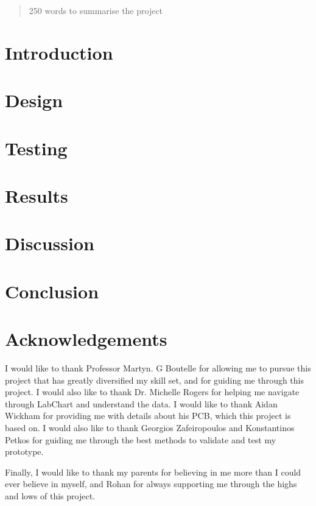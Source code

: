 \documentclass[12pt,twoside]{article}
\begin{document}


\begin{abstract}
    250 words to summarise the project
    
\end{abstract}

\newpage


\section{Introduction}


\section{Design}


\section{Testing}


\section{Results}


\section{Discussion}


\section{Conclusion}


\section{Acknowledgements}
I would like to thank Professor Martyn. G Boutelle for allowing me to pursue this project that has greatly diversified my skill set, and for guiding me through this project. I would also like to thank Dr. Michelle Rogers for helping me navigate through LabChart and understand the data. I would like to thank Aidan Wickham for providing me with details about his PCB, which this project is based on. I would also like to thank Georgios Zafeiropoulos and Konstantinos Petkos for guiding me through the best methods to validate and test my prototype. 

Finally, I would like to thank my parents for believing in me more than I could ever believe in myself, and Rohan for always supporting me through the highs and lows of this project.
\end{document}
